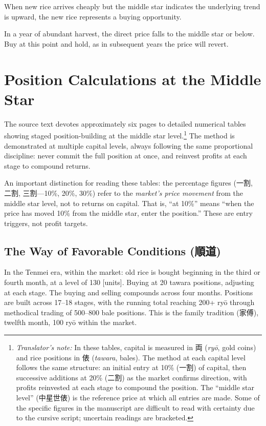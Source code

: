\documentclass[10pt, openany]{book}
\newcommand{\jp}[1]{{\japanesefont #1}}
\newcommand{\tn}[1]{\footnote{\textit{Translator's note:} #1}}
\begin{document}
When new rice arrives cheaply but the middle star indicates the underlying
trend is upward, the new rice represents a buying opportunity.

In a year of abundant harvest, the direct price falls to the middle star or
below. Buy at this point and hold, as in subsequent years the price will
revert.

\section{Position Calculations at the Middle Star}

The source text devotes approximately six pages to detailed numerical
tables showing staged position-building at the middle star
level.\tn{In these tables, capital is measured in \jp{両} (\textit{ry\=o},
gold coins) and rice positions in \jp{俵} (\textit{tawara}, bales). The
method at each capital level follows the same structure: an initial entry
at 10\% (\jp{一割}) of capital, then successive additions at 20\%
(\jp{二割}) as the market confirms direction, with profits reinvested
at each stage to compound the position. The ``middle star level''
(\jp{中星世俵}) is the reference price at which all entries are made.
Some of the specific figures in the manuscript are difficult to read
with certainty due to the cursive script; uncertain readings are
bracketed.}
The method is demonstrated at multiple capital levels, always following
the same proportional discipline: never commit the full position at once,
and reinvest profits at each stage to compound returns.

An important distinction for reading these tables: the percentage figures
(\jp{一割}, \jp{二割}, \jp{三割}---10\%, 20\%, 30\%) refer to the
\textit{market's price movement} from the middle star level, not to
returns on capital. That is, ``at 10\%'' means ``when the price has
moved 10\% from the middle star, enter the position.'' These are
entry triggers, not profit targets.

\subsection{The Way of Favorable Conditions (\jp{順道})}

In the Tenmei era, within the market: old rice is bought beginning in the
third or fourth month, at a level of 130 [units]. Buying at 20 tawara
positions, adjusting at each stage. The buying and selling compounds
across four months. Positions are built across 17--18 stages, with the
running total reaching 200+ ry\=o through methodical trading of 500--800
bale positions. This is the family tradition (\jp{家傅}), twelfth month,
100 ry\=o within the market.
\end{document}
